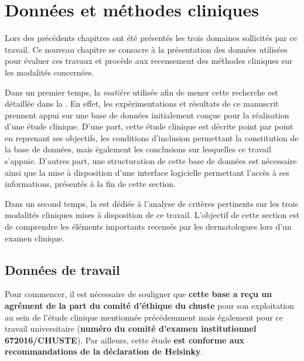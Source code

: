 \renewcommand{\thechapter}{\arabic{chapter}}
\setcounter{chapter}{3}

\chapter{Données et méthodes cliniques}
\label{chap:chapter_4}
\chapterintro
Lors des précédents chapitres ont été présentés les trois domaines sollicités par ce travail. Ce nouveau chapitre se consacre à la présentation des données utilisées pour évaluer ces travaux et procède aux recensement des méthodes cliniques sur les modalités concernées.\par

Dans un premier temps, la \textit{matière} utilisée afin de mener cette recherche est détaillée dans la . En effet, les expérimentations et résultats de ce manuscrit prennent appui sur une base de données initialement conçue pour la réalisation d'une étude clinique.  D’une part, cette étude clinique est décrite point par point en reprenant ses objectifs, les conditions d'inclusion permettant la constitution de la base de données, mais également les conclusions sur lesquelles ce travail s'appuie. D’autres part, une structuration de cette base de données est nécessaire ainsi que la mise à disposition d’une interface logicielle permettant l’accès à ses informations, présentés à la fin de cette section.\par

Dans un second temps, la  est dédiée à l’analyse de critères pertinents sur les trois modalités cliniques mises à disposition de ce travail. L'objectif de cette section est de comprendre les éléments importants recensés par les dermatologues lors d'un examen clinique.\par
\newpage

\section{Données de travail}
\label{sec:clinical_data}
Pour commencer, il est nécessaire de souligner que \textbf{cette base a reçu un agrément de la part du comité d'éthique du \acrfull{chuste}} pour son exploitation au sein de l'étude clinique mentionnée précédemment mais également pour ce travail universitaire (\textbf{numéro du comité d'examen institutionnel 672016/CHUSTE}). Par ailleurs, cette étude \textbf{est conforme aux recommandations de la déclaration de Helsinky}.\par

